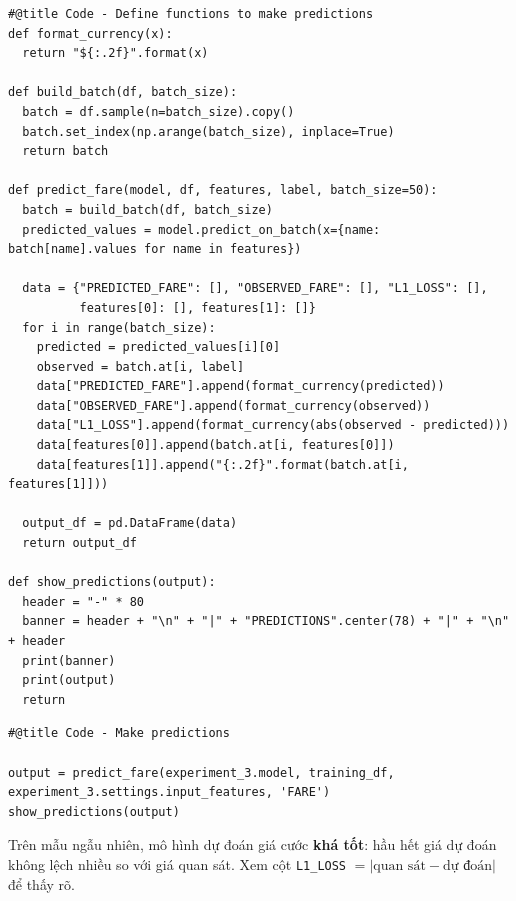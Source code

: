 \documentclass[12pt,a4paper]{article}
\begin{document}
\begin{lstlisting}
#@title Code - Define functions to make predictions
def format_currency(x):
  return "${:.2f}".format(x)

def build_batch(df, batch_size):
  batch = df.sample(n=batch_size).copy()
  batch.set_index(np.arange(batch_size), inplace=True)
  return batch

def predict_fare(model, df, features, label, batch_size=50):
  batch = build_batch(df, batch_size)
  predicted_values = model.predict_on_batch(x={name: batch[name].values for name in features})

  data = {"PREDICTED_FARE": [], "OBSERVED_FARE": [], "L1_LOSS": [],
          features[0]: [], features[1]: []}
  for i in range(batch_size):
    predicted = predicted_values[i][0]
    observed = batch.at[i, label]
    data["PREDICTED_FARE"].append(format_currency(predicted))
    data["OBSERVED_FARE"].append(format_currency(observed))
    data["L1_LOSS"].append(format_currency(abs(observed - predicted)))
    data[features[0]].append(batch.at[i, features[0]])
    data[features[1]].append("{:.2f}".format(batch.at[i, features[1]]))

  output_df = pd.DataFrame(data)
  return output_df

def show_predictions(output):
  header = "-" * 80
  banner = header + "\n" + "|" + "PREDICTIONS".center(78) + "|" + "\n" + header
  print(banner)
  print(output)
  return
\end{lstlisting}

\begin{lstlisting}
#@title Code - Make predictions

output = predict_fare(experiment_3.model, training_df, experiment_3.settings.input_features, 'FARE')
show_predictions(output)
\end{lstlisting}

\begin{vidu}[title={Đáp án tham khảo}]
Trên mẫu ngẫu nhiên, mô hình dự đoán giá cước \textbf{khá tốt}: hầu hết giá dự đoán không lệch nhiều so với giá quan sát.
Xem cột \texttt{L1\_LOSS} $= |\text{quan sát} - \text{dự đoán}|$ để thấy rõ.
\end{vidu}
\end{document}
